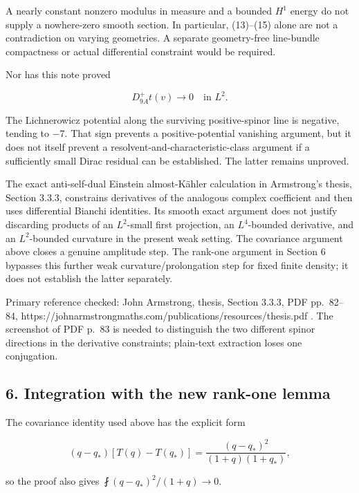 \documentclass[11pt]{article}
\begin{document}
A nearly constant nonzero modulus in measure and a bounded \(H^1\)
energy do not supply a nowhere-zero smooth section. In particular,
(13)--(15) alone are not a contradiction on varying geometries. A
separate geometry-free line-bundle compactness or actual differential
constraint would be required.

Nor has this note proved

\[
 D^+_{9A}t(v)\to0\quad\text{in }L^2.
\]

The Lichnerowicz potential along the surviving positive-spinor line is
negative, tending to \(-7\). That sign prevents a positive-potential
vanishing argument, but it does not itself prevent a
resolvent-and-characteristic-class argument if a sufficiently small
Dirac residual can be established. The latter remains unproved.

The exact anti-self-dual Einstein almost-Kähler calculation in
Armstrong's thesis, Section 3.3.3, constrains derivatives of the
analogous complex coefficient and then uses differential Bianchi
identities. Its smooth exact argument does not justify discarding
products of an \(L^2\)-small first projection, an \(L^4\)-bounded
derivative, and an \(L^2\)-bounded curvature in the present weak
setting. The covariance argument above closes a genuine amplitude step.
The rank-one argument in Section 6 bypasses this further weak
curvature/prolongation step for fixed finite density; it does not
establish the latter separately.

Primary reference checked: John Armstrong, thesis, Section 3.3.3, PDF
pp.~82--84,
https://johnarmstrongmaths.com/publications/resources/thesis.pdf . The
screenshot of PDF p.~83 is needed to distinguish the two different
spinor directions in the derivative constraints; plain-text extraction
loses one conjugation.

\hypertarget{integration-with-the-new-rank-one-lemma}{%
\subsection{6. Integration with the new rank-one
lemma}\label{integration-with-the-new-rank-one-lemma}}

The covariance identity used above has the explicit form

\[
 (q-q_*)[T(q)-T(q_*)]
 =\frac{(q-q_*)^2}{(1+q)(1+q_*)},
\]

so the proof also gives \(\fint (q-q_*)^2/(1+q)\to0\).
\end{document}

